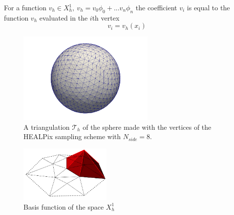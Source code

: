 \vspace{0.5cm}
\begin{remark}
	For a function $v_h \in X^1_h,\ v_h = v_0 \phi_0 +...  v_n \phi_n$ the coefficient $v_i$ is equal to the function $v_h$ evaluated in the $i$th vertex 
	\begin{equation}\label{eq:dof and values}
	v_i = v_h( x_i)
	\end{equation}
\end{remark}\vspace{0.5cm}
\begin{figure}[h]
	\begin{center}
		\includegraphics[width=0.6\textwidth]{figs/Chapter3/sphere_mesh.png}
	\end{center}
	\caption{\label{fig:sphere mesh}A triangulation $\mathcal T_h$ of the sphere made with the vertices of the HEALPix sampling scheme with $N_{side}=8$.}
\end{figure}
\begin{figure}
	\begin{center}
		\includegraphics[width=0.4\textwidth]{figs/Chapter3/basisfunction.png}
	\end{center}
	\caption{\label{fig:basis function}Basis function of the space $X^{1}_h$}
\end{figure}


